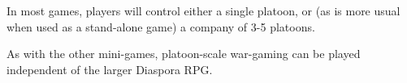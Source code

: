 In most games, players will control either a single platoon, or (as is more usual when used as a stand-alone game) a company of 3-5 platoons.

As with the other mini-games, platoon-scale war-gaming can be played independent of the larger Diaspora RPG.










